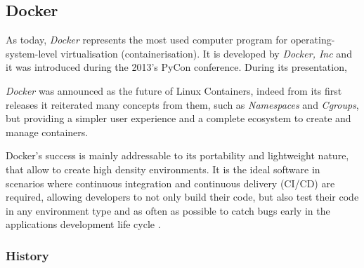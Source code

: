 \documentclass[a4paper,12pt]{article}
\begin{document}
\subsection{Docker}

As today, \textit{Docker} represents the most used computer program for
operating-system-level virtualisation (containerisation). It is developed by
\textit{Docker, Inc}\cite{docker_official_site} and it was introduced during the
2013's PyCon conference. During its presentation, \par\textit{Docker} was
announced as the future of Linux Containers\cite{docker_pycon_presentation},
indeed from its first releases it reiterated many concepts from them, such as
\textit{Namespaces} and \textit{Cgroups}, but providing a simpler user
experience and a complete ecosystem to create and manage containers.\par
Docker's success is mainly addressable to its portability and lightweight
nature, that allow to create high density environments. It is the ideal software
in scenarios where continuous integration and continuous delivery (CI/CD) are
required, allowing developers to not only build their code, but also test their
code in any environment type and as often as possible to catch bugs early in the
applications development life cycle \cite{docker_ci_cd}. 

\subsubsection{History}
\end{document}
